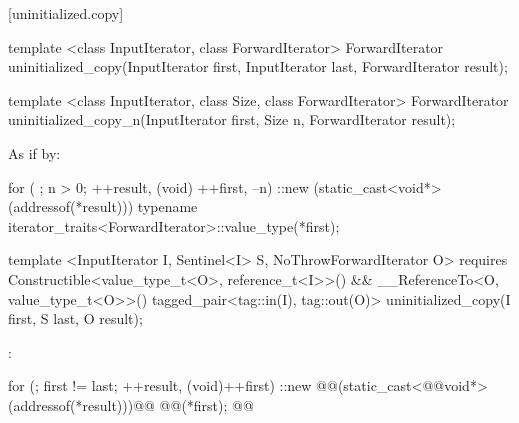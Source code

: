 [uninitialized.copy]{}
{\color{remclr}
\begin{codeblock}
template <class InputIterator, class ForwardIterator>
  ForwardIterator uninitialized_copy(InputIterator first, InputIterator last,
                                     ForwardIterator result);
\end{codeblock}

\setcounter{Paras}{1}
\pnum
\returns {}
\begin{codeblock}
template <class InputIterator, class Size, class ForwardIterator>
  ForwardIterator uninitialized_copy_n(InputIterator first, Size n,
                                       ForwardIterator result);
\end{codeblock}

\pnum
\effects As if by:
\begin{codeblock}
        for ( ; n > 0; ++result, (void) ++first, --n) {
          ::new (static_cast<void*>(addressof(*result)))
            typename iterator_traits<ForwardIterator>::value_type(*first);
        }
\end{codeblock}

\pnum
\returns {}
} %

{\color{addclr}
\begin{codeblock}
template <InputIterator I, Sentinel<I> S, NoThrowForwardIterator O>
  requires Constructible<value_type_t<O>, reference_t<I>>() &&
           __ReferenceTo<O, value_type_t<O>>()
    tagged_pair<tag::in(I), tag::out(O)>
    uninitialized_copy(I first, S last, O result);
\end{codeblock}
} %

\setcounter{Paras}{0}
\pnum
\effects {}:
\begin{codeblock}
        for (; first != last; ++result, (void)++first)
          ::new @@(static_cast<@@void*>(addressof(*result)))@\added{)}@
            @@(*first);
        @@
\end{codeblock}


